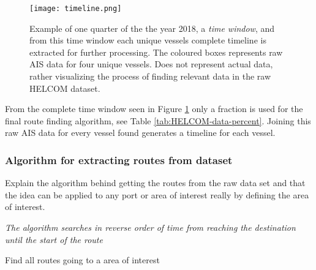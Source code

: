\documentclass[../main.tex]{subfiles}
\begin{document}
\begin{figure}[H]
	\centering
	\texttt{[image: timeline.png]}
	\caption{Example of one quarter of the the year 2018, a \textit{time window}, and from this time window each unique vessels complete timeline is extracted for further processing. The coloured boxes represents raw AIS data for four unique vessels. Does not represent actual data, rather visualizing the process of finding relevant data in the raw HELCOM dataset.}
	\label{fig:timeline}
\end{figure}

From the complete time window seen in Figure \ref{fig:timeline} only a fraction is used for the final route finding algorithm, see Table \ref{tab:HELCOM-data-percent}. Joining this raw AIS data for every vessel found generates a timeline for each vessel.

\subsubsection{Algorithm for extracting routes from dataset}

Explain the algorithm behind getting the routes from the raw data set and that the idea can be applied to any port or area of interest really by defining the area of interest.

\begin{algorithm}[H]
\SetAlgoNoLine
\SetAlgoNoEnd

\emph{The algorithm searches in reverse order of time from reaching the destination until the start of the route}\;
\BlankLine
{}
\caption{Find all routes going to a area of interest}
\label{alg:search}
\end{algorithm}
\end{document}
